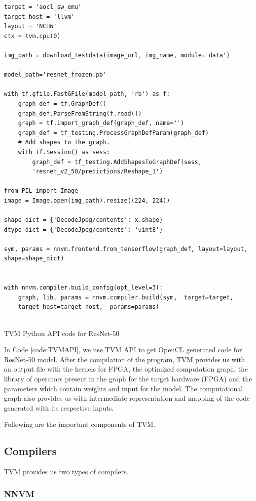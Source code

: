  \begin{code}[!htb]
 \begin{verbatim}
target = 'aocl_sw_emu'
target_host = 'llvm'
layout = 'NCHW'
ctx = tvm.cpu(0)

img_path = download_testdata(image_url, img_name, module='data')

model_path='resnet_frozen.pb'

with tf.gfile.FastGFile(model_path, 'rb') as f:
    graph_def = tf.GraphDef()
    graph_def.ParseFromString(f.read())
    graph = tf.import_graph_def(graph_def, name='')
    graph_def = tf_testing.ProcessGraphDefParam(graph_def)
    # Add shapes to the graph.
    with tf.Session() as sess:
        graph_def = tf_testing.AddShapesToGraphDef(sess,
        'resnet_v2_50/predictions/Reshape_1')   

from PIL import Image
image = Image.open(img_path).resize((224, 224))

shape_dict = {'DecodeJpeg/contents': x.shape}
dtype_dict = {'DecodeJpeg/contents': 'uint8'}

sym, params = nnvm.frontend.from_tensorflow(graph_def, layout=layout,
shape=shape_dict)


with nnvm.compiler.build_config(opt_level=3):
    graph, lib, params = nnvm.compiler.build(sym,  target=target,
    target_host=target_host,  params=params)


\end{verbatim}
\caption{TVM Python API code for ResNet-50}
\label{code:TVMAPI}
\end{code}


In Code \ref{code:TVMAPI}, we use TVM API to get OpenCL generated code for ResNet-50 model.
After the compilation of the program, TVM provides us with an output file with the kernels for FPGA, the optimized computation graph, the library of operators present in the graph for the target hardware (FPGA) and the parameters which contain weights and input for the model. The computational graph also provides us with intermediate representation and mapping of the code generated with its respective inputs.

\pagebreak
 
 Following are the important components of TVM.
 
 \subsection{Compilers}
 TVM provides us two types of compilers.
 
 
 \subsubsection{NNVM}
 
